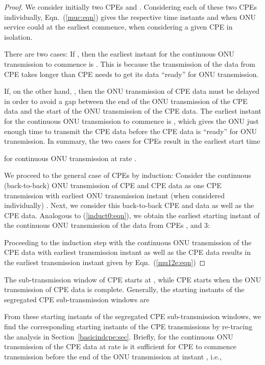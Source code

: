\documentclass[pdftex,journal]{IEEEtran}
\begin{document}
\begin{proof}
We consider initially two CPEs  and .
Considering each of these two CPEs individually,
Eqn.~(\ref{muc:eqn}) gives the respective time instants  and
 when ONU service could at the earliest commence, when considering
a given CPE in isolation.

 There are two cases:
 If , then the earliest instant for the
 continuous ONU transmission to commence is . This is because the
 transmission of the data from CPE  takes longer
than CPE  needs to get its data ``ready'' for ONU transmission.

 If, on the other hand, ,
then the ONU transmission of CPE  data must be delayed
in order to avoid a gap between the end of the ONU transmission of the
CPE  data and the start of the ONU transmission of the
CPE  data.
The earliest instant for the continuous ONU transmission to commence is
, which gives the ONU just enough time to transmit
the CPE  data before the CPE  data is ``ready'' for ONU
transmission.
In summary, the two cases for  CPEs result in the earliest
start time

for continuous ONU transmission at rate .

We proceed to the general case of  CPEs by induction:
Consider the continuous (back-to-back) ONU transmission of
CPE  and CPE  data as one CPE transmission with
earliest ONU transmission instant (when considered individually)
.
Next, we consider this back-to-back CPE  and  data
as well as the CPE  data. Analogous to (\ref{induct0:eqn}),
we obtain the earliest starting instant of the continuous
ONU transmission of the data from CPEs , and 3:

Proceeding to the induction step with the continuous ONU transmission
of the CPE  data with earliest transmission instant
 as well as the CPE  data results in the
earliest transmission instant given by Eqn.~(\ref{mu12e:eqn})
\end{proof}

The sub-transmission window of CPE  starts at ,
while CPE  starts when the ONU transmission of CPE  data is
complete. Generally, the starting instants of the segregated CPE
sub-transmission windows  are

From these starting instants  of the segregated CPE sub-transmission
windows, we find the corresponding starting instants 
of the CPE transmissions by re-tracing the analysis in
Section~\ref{basicindcpe:sec}.
Briefly, for the continuous ONU transmission of the CPE  data at rate
 is it sufficient for CPE  to commence transmission
 before the end of the ONU transmission at instant
, i.e.,
\end{document}
